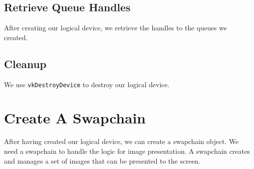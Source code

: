 \begin{minipage}{\linewidth}{\noindent}
    
\end{minipage}

\begin{minipage}{\linewidth}{\noindent}
    
\end{minipage}

\subsection{Retrieve Queue Handles}

After creating our logical device, we retrieve the handles to the
queues we created.

\begin{minipage}{\linewidth}{\noindent}
    
\end{minipage}

\subsection{Cleanup}

We use \texttt{vkDestroyDevice} to destroy our logical device.

\section{Create A Swapchain}

After having created our logical device, we can create a swapchain object.
We need a swapchain to handle the logic for image presentation.
A swapchain creates and manages a set of images that can be presented to the screen.

\begin{minipage}{\linewidth}{\noindent}
    
\end{minipage}

